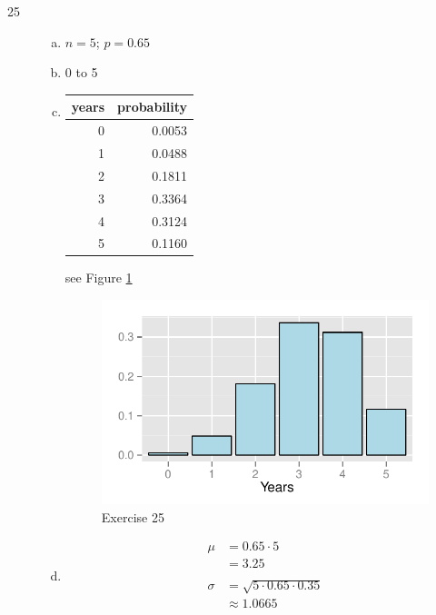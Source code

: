 \documentclass[letterpaper, landscape]{exam}
\begin{document}
\begin{description}
      \item[25]
        \begin{enumerate}[(a)]
          \item $n = 5$; $p = 0.65$

          \item 0 to 5

          \item 
            \begin{table}[ht]
              \centering
              \begin{tabular}{rr}
                \toprule
                years & probability \\
                \midrule
                0     & 0.0053 \\
                1     & 0.0488 \\
                2     & 0.1811 \\
                3     & 0.3364 \\
                4     & 0.3124 \\
                5     & 0.1160 \\
                \bottomrule
              \end{tabular}
            \end{table}

            see Figure \ref{fig:ex25}

            \begin{figure}[H]
              \centering
              \includegraphics{ex25.pdf}
              \caption{Exercise 25}
              \label{fig:ex25}
            \end{figure}

          \item 
            \begin{align*}
              \mu    & = 0.65 \cdot 5 \\
                     & = \boxed{ 3.25 } \\
              \\
              \sigma & = \sqrt{5 \cdot 0.65 \cdot 0.35} \\
                     & \approx \boxed{ 1.0665 } \\
            \end{align*}
        \end{enumerate}


\end{description}
\end{document}
